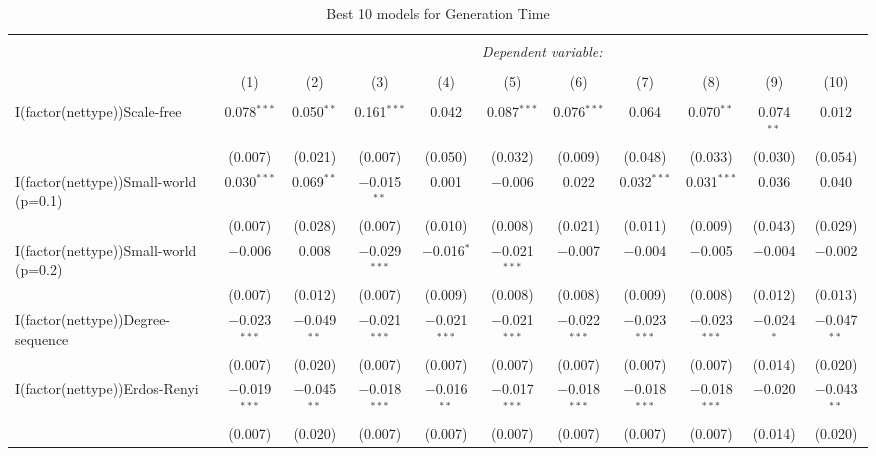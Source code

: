 
\begin{table}[!htbp] \centering 
  \caption{Best 10 models for Generation Time} 
  \label{tab:best_models_gentime} 
\begin{tabular}{@{\extracolsep{5pt}}lcccccccccc} 
\\[-1.8ex]\hline 
\hline \\[-1.8ex] 
 & \multicolumn{10}{c}{\textit{Dependent variable:}} \\ 
\cline{2-11} 
\\[-1.8ex] & (1) & (2) & (3) & (4) & (5) & (6) & (7) & (8) & (9) & (10)\\ 
\hline \\[-1.8ex] 
 I(factor(nettype))Scale-free & 0.078$^{***}$ & 0.050$^{**}$ & 0.161$^{***}$ & 0.042 & 0.087$^{***}$ & 0.076$^{***}$ & 0.064 & 0.070$^{**}$ & 0.074$^{**}$ & 0.012 \\ 
  & (0.007) & (0.021) & (0.007) & (0.050) & (0.032) & (0.009) & (0.048) & (0.033) & (0.030) & (0.054) \\ 
  I(factor(nettype))Small-world (p=0.1) & 0.030$^{***}$ & 0.069$^{**}$ & $-$0.015$^{**}$ & 0.001 & $-$0.006 & 0.022 & 0.032$^{***}$ & 0.031$^{***}$ & 0.036 & 0.040 \\ 
  & (0.007) & (0.028) & (0.007) & (0.010) & (0.008) & (0.021) & (0.011) & (0.009) & (0.043) & (0.029) \\ 
  I(factor(nettype))Small-world (p=0.2) & $-$0.006 & 0.008 & $-$0.029$^{***}$ & $-$0.016$^{*}$ & $-$0.021$^{***}$ & $-$0.007 & $-$0.004 & $-$0.005 & $-$0.004 & $-$0.002 \\ 
  & (0.007) & (0.012) & (0.007) & (0.009) & (0.008) & (0.008) & (0.009) & (0.008) & (0.012) & (0.013) \\ 
  I(factor(nettype))Degree-sequence & $-$0.023$^{***}$ & $-$0.049$^{**}$ & $-$0.021$^{***}$ & $-$0.021$^{***}$ & $-$0.021$^{***}$ & $-$0.022$^{***}$ & $-$0.023$^{***}$ & $-$0.023$^{***}$ & $-$0.024$^{*}$ & $-$0.047$^{**}$ \\ 
  & (0.007) & (0.020) & (0.007) & (0.007) & (0.007) & (0.007) & (0.007) & (0.007) & (0.014) & (0.020) \\ 
  I(factor(nettype))Erdos-Renyi & $-$0.019$^{***}$ & $-$0.045$^{**}$ & $-$0.018$^{***}$ & $-$0.016$^{**}$ & $-$0.017$^{***}$ & $-$0.018$^{***}$ & $-$0.018$^{***}$ & $-$0.018$^{***}$ & $-$0.020 & $-$0.043$^{**}$ \\ 
  & (0.007) & (0.020) & (0.007) & (0.007) & (0.007) & (0.007) & (0.007) & (0.007) & (0.014) & (0.020) \\ 

\end{tabular}
\end{table}
